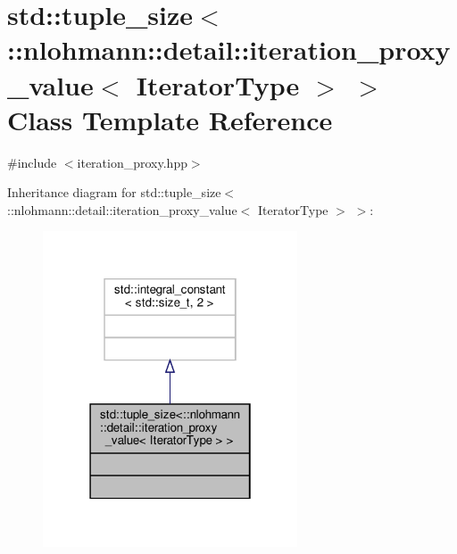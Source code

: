 \hypertarget{classstd_1_1tuple__size_3_1_1nlohmann_1_1detail_1_1iteration__proxy__value_3_01_iterator_type_01_4_01_4}{}\section{std\+:\+:tuple\+\_\+size$<$\+:\+:nlohmann\+:\+:detail\+:\+:iteration\+\_\+proxy\+\_\+value$<$ Iterator\+Type $>$ $>$ Class Template Reference}
\label{classstd_1_1tuple__size_3_1_1nlohmann_1_1detail_1_1iteration__proxy__value_3_01_iterator_type_01_4_01_4}


{\ttfamily \#include $<$iteration\+\_\+proxy.\+hpp$>$}



Inheritance diagram for std\+:\+:tuple\+\_\+size$<$\+:\+:nlohmann\+:\+:detail\+:\+:iteration\+\_\+proxy\+\_\+value$<$ Iterator\+Type $>$ $>$\+:
\nopagebreak
\begin{figure}[H]
\begin{center}
\leavevmode
\includegraphics[width=214pt]{classstd_1_1tuple__size_3_1_1nlohmann_1_1detail_1_1iteration__proxy__value_3_01_iterator_type_01_4_01_4__inherit__graph}
\end{center}
\end{figure}


